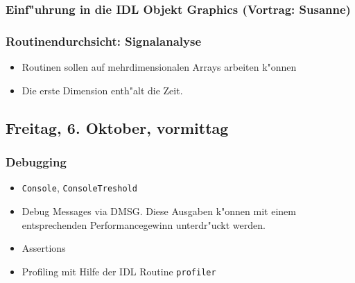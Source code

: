\documentclass[12pt]{article}
\begin{document}
\subsubsection{Einf"uhrung in die IDL Objekt Graphics (Vortrag: Susanne)}

\subsubsection{Routinendurchsicht: Signalanalyse}
\begin{itemize}
\item Routinen sollen auf mehrdimensionalen Arrays arbeiten k"onnen
\item Die erste Dimension enth"alt die Zeit.
\end{itemize}

\subsection{Freitag, 6. Oktober, vormittag}

\subsubsection{Debugging}
\begin{itemize}
\item \texttt{Console}, \texttt{ConsoleTreshold}
\item Debug Messages via DMSG. Diese Ausgaben k"onnen mit einem entsprechenden Performancegewinn unterdr"uckt werden.
\item Assertions
\item Profiling mit Hilfe der IDL Routine \texttt{profiler}
\end{itemize}
%
% 
\end{document}
